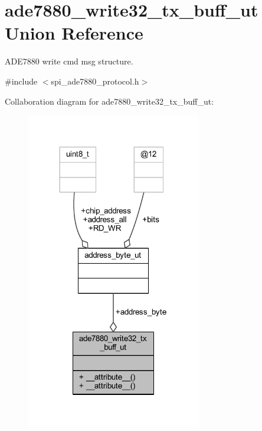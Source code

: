 \hypertarget{a00018}{\section{ade7880\-\_\-write32\-\_\-tx\-\_\-buff\-\_\-ut Union Reference}
\label{d1/d2b/a00018}
}


A\-D\-E7880 write cmd msg structure.  




{\ttfamily \#include $<$spi\-\_\-ade7880\-\_\-protocol.\-h$>$}



Collaboration diagram for ade7880\-\_\-write32\-\_\-tx\-\_\-buff\-\_\-ut\-:\nopagebreak
\begin{figure}[H]
\begin{center}
\leavevmode
\includegraphics[width=216pt]{d1/d6e/a00073}
\end{center}
\end{figure}
